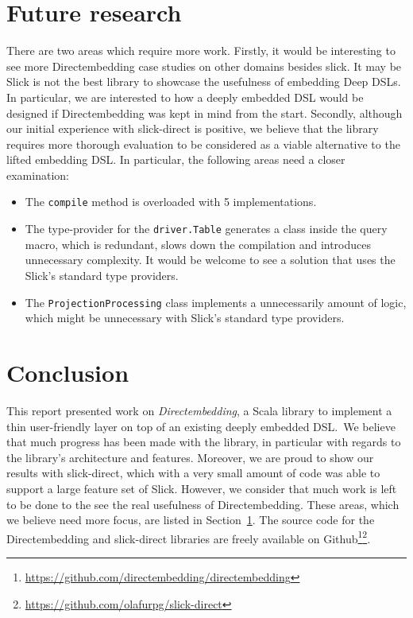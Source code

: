 \section{Future research} %
\label{sec:Future_research}
There are two areas which require more work.
Firstly, it would be interesting to see more Directembedding case studies on other domains besides slick.
It may be Slick is not the best library to showcase the usefulness of embedding Deep DSLs.
In particular, we are interested to how a deeply embedded DSL would be designed if Directembedding was kept in mind from the start.
Secondly, although our initial experience with slick-direct is positive, we believe that the library requires more thorough evaluation to be considered as a viable alternative to the lifted embedding DSL.
In particular, the following areas need a closer examination:
\begin{itemize}
    \item The \texttt{compile} method is overloaded with 5 implementations.
    \item The type-provider for the \texttt{driver.Table} generates a class inside the query macro, which is redundant, slows down the compilation and introduces unnecessary complexity. It would be welcome to see a solution that uses the Slick's standard type providers.
    \item The \texttt{ProjectionProcessing} class implements a unnecessarily amount of logic, which might be unnecessary with Slick's standard type providers.
\end{itemize}

\section{Conclusion} %
\label{sec:Conclusion}
This report presented work on \emph{Directembedding}, a Scala library to implement a thin user-friendly layer on top of an existing deeply embedded DSL.\
We believe that much progress has been made with the library, in particular with regards to the library's architecture and features.
Moreover, we are proud to show our results with slick-direct, which with a very small amount of code was able to support a large feature set of Slick.
However, we consider that much work is left to be done to the see the real usefulness of Directembedding.
These areas, which we believe need more focus, are listed in Section~\ref{sec:Future_research}.
The source code for the Directembedding and slick-direct libraries are freely available on Github\footnote{\href{https://github.com/directembedding/directembedding}{https://github.com/directembedding/directembedding}}\footnote{\href{https://github.com/olafurpg/slick-direct}{https://github.com/olafurpg/slick-direct}}.


